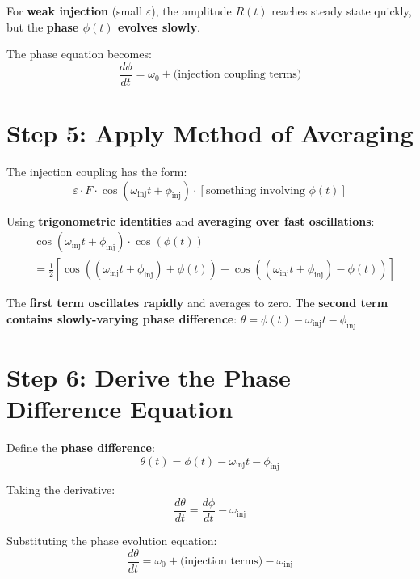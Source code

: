 \documentclass{article}
\begin{document}
For \textbf{weak injection} (small $\varepsilon$), the amplitude $R(t)$ reaches steady state quickly, but the \textbf{phase $\phi(t)$ evolves slowly}.

The phase equation becomes:
\begin{equation}
\frac{d\phi}{dt} = \omega_0 + \text{(injection coupling terms)}
\end{equation}

\section{Step 5: Apply Method of Averaging}

The injection coupling has the form:
\begin{equation}
\varepsilon \cdot F \cdot \cos(\omega_{\text{inj}}t + \phi_{\text{inj}}) \cdot [\text{something involving } \phi(t)]
\end{equation}

Using \textbf{trigonometric identities} and \textbf{averaging over fast oscillations}:
\begin{align}
&\cos(\omega_{\text{inj}}t + \phi_{\text{inj}}) \cdot \cos(\phi(t)) \nonumber \\
&= \frac{1}{2}[\cos((\omega_{\text{inj}}t + \phi_{\text{inj}}) + \phi(t)) + \cos((\omega_{\text{inj}}t + \phi_{\text{inj}}) - \phi(t))]
\end{align}

The \textbf{first term oscillates rapidly} and averages to zero.
The \textbf{second term contains slowly-varying phase difference}: $\theta = \phi(t) - \omega_{\text{inj}}t - \phi_{\text{inj}}$

\section{Step 6: Derive the Phase Difference Equation}

Define the \textbf{phase difference}:
\begin{equation}
\theta(t) = \phi(t) - \omega_{\text{inj}}t - \phi_{\text{inj}}
\end{equation}

Taking the derivative:
\begin{equation}
\frac{d\theta}{dt} = \frac{d\phi}{dt} - \omega_{\text{inj}}
\end{equation}

Substituting the phase evolution equation:
\begin{equation}
\frac{d\theta}{dt} = \omega_0 + \text{(injection terms)} - \omega_{\text{inj}}
\end{equation}
\end{document}
